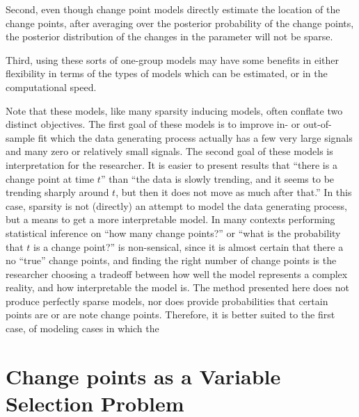 Second, even though change point models directly estimate the location of the change points, after averaging over the posterior probability of the change points, the posterior distribution of the changes in the parameter will not be sparse. 

Third, using these sorts of one-group models may have some benefits in either flexibility in terms of the types of models which can be estimated, or in the computational speed.

Note that these models, like many sparsity inducing models, often conflate two distinct objectives. 
The first goal of these models is to improve in- or out-of-sample fit which the data generating process actually has a few very large signals and many zero or relatively small signals.
The second goal of these models is interpretation for the researcher.
It is easier to present results that ``there is a change point at time $t$'' than ``the data is slowly trending, and it seems to be trending sharply around $t$, but then it does not move as much after that.''
In this case, sparsity is not (directly) an attempt to model the data generating process, but a means to get a more interpretable model.
In many contexts performing statistical inference on ``how many change points?'' or ``what is the probability that $t$ is a change point?'' is non-sensical, since it is almost certain that there a no ``true'' change points, and finding the right number of change points is the researcher choosing a tradeoff between how well the model represents a complex reality, and how interpretable the model is.
The method presented here does not produce perfectly sparse models, nor does provide probabilities that certain points are or are note change points. 
Therefore, it is better suited to the first case, of modeling cases in which the 


\section{Change points as a Variable Selection Problem}
\label{dlm:sec:chang-as-vari}

